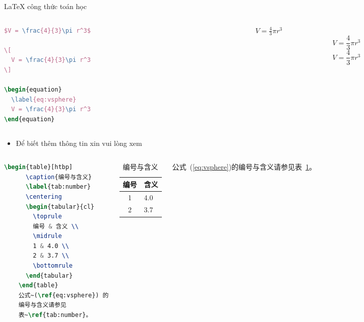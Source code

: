 \documentclass{beamer}
\begin{document}
\begin{frame}[fragile]{\LaTeX{} công thức toán học}
    \begin{columns}
        \begin{column}{.55\textwidth}
\begin{lstlisting}[language=TeX]
$V = \frac{4}{3}\pi r^3$

\[
  V = \frac{4}{3}\pi r^3
\]

\begin{equation}
  \label{eq:vsphere}
  V = \frac{4}{3}\pi r^3
\end{equation}
\end{lstlisting}
        \end{column}
        \begin{column}{.4\textwidth}
            $V = \frac{4}{3}\pi r^3$
            \[
                V = \frac{4}{3}\pi r^3
            \]
            \begin{equation}
                \label{eq:vsphere}
                V = \frac{4}{3}\pi r^3
            \end{equation}
        \end{column}
    \end{columns}
    \begin{itemize}
        \item Để biết thêm thông tin xin vui lòng xem \href{https://vi.wikipedia.org/wiki/Tr%E1%BB%A3_gi%C3%BAp:To%C3%A1n_h%E1%BB%8Dc}{\color{purple}{đây}}
    \end{itemize}
\end{frame}

\begin{frame}[fragile]
    \begin{columns}
\begin{lstlisting}[language=TeX]
    \begin{table}[htbp]
      \caption{编号与含义}
      \label{tab:number}
      \centering
      \begin{tabular}{cl}
        \toprule
        编号 & 含义 \\
        \midrule
        1 & 4.0 \\
        2 & 3.7 \\
        \bottomrule
      \end{tabular}
    \end{table}
    公式~(\ref{eq:vsphere}) 的
    编号与含义请参见
    表~\ref{tab:number}。
\end{lstlisting}
        \begin{table}[htpb]
            \centering
            \caption{编号与含义}
            \label{tab:number}
            \begin{tabular}{cl}\toprule
                编号 & 含义 \\\midrule
                1 & 4.0\\
                2 & 3.7\\\bottomrule
            \end{tabular}
        \end{table}
        \normalsize 公式~(\ref{eq:vsphere})的编号与含义请参见表~\ref{tab:number}。
    \end{columns}
\end{frame}
\end{document}
